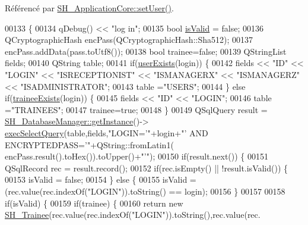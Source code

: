 Référencé par \hyperlink{classSH__ApplicationCore_a2dd5c029a2ea348f1dfd0a60dea476e4}{S\-H\-\_\-\-Application\-Core\-::set\-User()}.


\begin{DoxyCode}
00133 \{
00134     qDebug() << \textcolor{stringliteral}{"log in"};
00135     \textcolor{keywordtype}{bool} \hyperlink{classSH__User_a07de5c02b2a02b3bb2b0aaf0886bb4d9}{isValid} = \textcolor{keyword}{false};
00136     QCryptographicHash encPass(QCryptographicHash::Sha512);
00137     encPass.addData(pass.toUtf8());
00138     \textcolor{keywordtype}{bool} trainee=\textcolor{keyword}{false};
00139     QStringList fields;
00140     QString table;
00141     \textcolor{keywordflow}{if}(\hyperlink{classSH__User_a64161b35866b1c635d5f4214095a2b1e}{userExists}(login)) \{
00142         fields << \textcolor{stringliteral}{"ID"} << \textcolor{stringliteral}{"LOGIN"} << \textcolor{stringliteral}{"ISRECEPTIONIST"} << \textcolor{stringliteral}{"ISMANAGERX"} << \textcolor{stringliteral}{"ISMANAGERZ"} << \textcolor{stringliteral}{"ISADMINISTRATOR"};
00143         table =\textcolor{stringliteral}{"USERS"};
00144     \} \textcolor{keywordflow}{else} \textcolor{keywordflow}{if}(\hyperlink{classSH__User_adfc35c967cb405f4a14886676612fbb7}{traineeExists}(login)) \{
00145         fields << \textcolor{stringliteral}{"ID"} << \textcolor{stringliteral}{"LOGIN"};
00146         table =\textcolor{stringliteral}{"TRAINEES"};
00147         trainee=\textcolor{keyword}{true};
00148     \}
00149     QSqlQuery result = \hyperlink{classSH__DatabaseManager_a31198eb4de0f8b18e3fa0eed09f24d19}{SH\_DatabaseManager::getInstance}()->
      \hyperlink{classSH__DatabaseManager_ab8f9850cb68444ab9a4e613b36a3b044}{execSelectQuery}(table,fields,\textcolor{stringliteral}{"LOGIN='"}+login+\textcolor{stringliteral}{"' AND ENCRYPTEDPASS='"}+QString::fromLatin1(
      encPass.result().toHex()).toUpper()+\textcolor{stringliteral}{"'"});
00150     \textcolor{keywordflow}{if}(result.next()) \{
00151         QSqlRecord rec = result.record();
00152         \textcolor{keywordflow}{if}(rec.isEmpty() || !result.isValid()) \{
00153             isValid = \textcolor{keyword}{false};
00154         \} \textcolor{keywordflow}{else} \{
00155             isValid = (rec.value(rec.indexOf(\textcolor{stringliteral}{"LOGIN"})).toString() == login);
00156         \}
00157 
00158         \textcolor{keywordflow}{if}(isValid) \{
00159             \textcolor{keywordflow}{if}(trainee) \{
00160                 \textcolor{keywordflow}{return} \textcolor{keyword}{new} \hyperlink{classSH__Trainee}{SH\_Trainee}(rec.value(rec.indexOf(\textcolor{stringliteral}{"LOGIN"})).toString(),rec.value(rec.

\end{DoxyCode}
